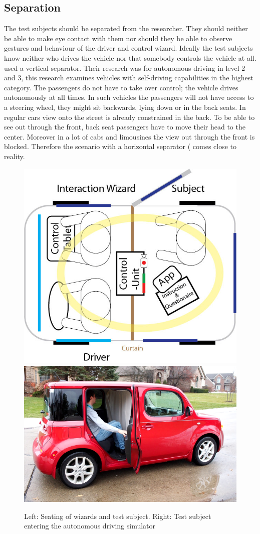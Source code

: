 \subsection{Separation}
The test subjects should be separated from the researcher. They should neither be able to make eye contact with them nor should they be able to observe gestures and behaviour of the driver and control wizard. Ideally the test subjects know neither who drives the vehicle nor that somebody controls the vehicle at all. \cite{Baltodano2015} used a vertical separator. Their research was for autonomous driving in level 2 and 3, this research examines vehicles with self-driving capabilities in the highest category. The passengers do not have to take over control; the vehicle drives autonomously at all times. In such vehicles the passengers will not have access to a steering wheel, they might sit backwards, lying down or in the back seats. In regular cars view onto the street is already constrained in the back. To be able to see out through the front, back seat passengers have to move their head to the center. Moreover in a lot of cabs and limousines the view out through the front is blocked. Therefore the scenario with a horizontal separator ( comes close to reality. 
\begin{figure}
    \includegraphics[height=0.38\textwidth]{fig/test-setup-hori}\hfill\includegraphics[height=0.35\textwidth]{fig/enter.png}
    \caption[Driving Simulator]{Left: Seating of wizards and test subject. Right: Test subject entering the autonomous driving simulator}
    \label{fig:testsetup}
\end{figure}

